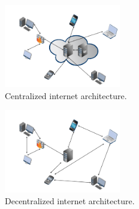 \begin{figure}[h]
	\begin{center}
	\includegraphics[width=2in]{centralized.png}
	\caption{ Centralized internet architecture.}
	\label{Fig.Centalize}
	\end{center}
\end{figure}
\begin{figure}[h]
	\begin{center}
	\includegraphics[width=2in]{decentralized.png}
	\caption{Decentralized internet architecture.}
	\label{Fig.Decentalize}
	\end{center}
\end{figure}
